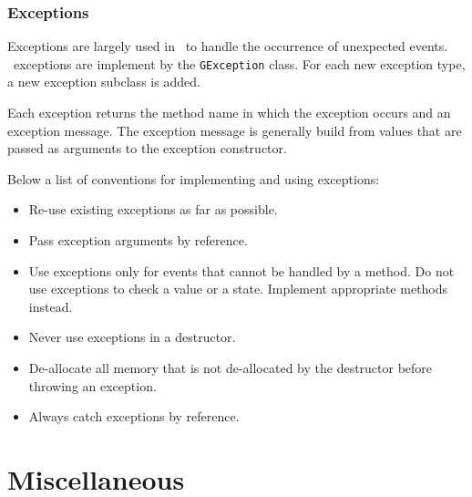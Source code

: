 \documentclass{article}[12pt,a4]
\begin{document}
\subsubsection{Exceptions}
\label{sec:exceptions}

Exceptions are largely used in \this\ to handle the occurrence of unexpected events.
\this\ exceptions are implement by the {\tt GException} class.
For each new exception type, a new exception subclass is added.

Each exception returns the method name in which the exception occurs and an exception
message.
The exception message is generally build from values that are passed as arguments to the
exception constructor.

Below a list of conventions for implementing and using exceptions:
\begin{itemize}
\item Re-use existing exceptions as far as possible.
\item Pass exception arguments by reference.
\item Use exceptions only for events that cannot be handled by a method.
Do not use exceptions to check a value or a state. Implement appropriate methods instead.
\item Never use exceptions in a destructor.
\item De-allocate all memory that is not de-allocated by the destructor before throwing an
exception. 
\item Always catch exceptions by reference.
\end{itemize}






\section{Miscellaneous}
\end{document}
